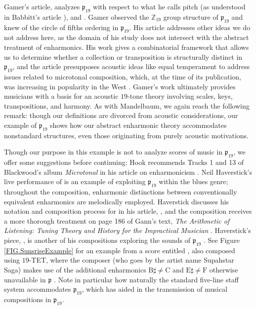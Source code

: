 \documentclass{article}
\theoremstyle{plain}
\theoremstyle{definition}
\theoremstyle{remark}
\begin{document}
Gamer's article,  analyzes $\mathfrak{p}_{19}$ with respect to what he calls pitch   (as understood in Babbitt's article  \cite{BabbittArticle}), and  \cite{Gamer}. Gamer observed the $\mathbb{Z}_{19}$ group structure of $\mathfrak{p}_{19}$ and knew of the circle of fifths ordering in $\mathfrak{p}_{19}$. His article addresses other ideas we do not address here, as the domain of his study does not intersect with the abstract treatment of enharmonics. His work gives a combinatorial framework that allows us to determine whether a collection or transposition is structurally distinct in $\mathfrak{p}_{19}$, and the article presupposes acoustic ideas like equal temperament to address issues related to microtonal composition, which, at the time of its publication, was increasing in popularity in the West \cite{Gamer}. Gamer's work ultimately provides musicians with a basis for an acoustic $19$-tone theory involving scales, keys, transpositions, and harmony. As with Mandelbaum, we again reach the following remark: though our definitions are divorced from acoustic considerations, our example of $\mathfrak{p}_{19}$ shows how our abstract enharmonic theory accommodates nonstandard structures, even those originating from purely acoustic motivations.

Though our purpose in this example is not to analyze scores of music in $\mathfrak{p}_{19}$, we offer some suggestions before continuing: Hook recommends Tracks 1 and 13 of Blackwood's album \textit{Microtonal} \cite{Blackwood} in his article on enharmonicism \cite{Hook}. Neil Haverstick's live performance of  is an example of exploiting $\mathfrak{p}_{19}$ within the blues genre; throughout the composition, enharmonic distinctions between conventionally equivalent enharmonics are melodically employed. Haverstick discusses his notation and composition process for  in his article,  \cite{HaverstickBirdwalk}, and the composition receives a more thorough treatment on page 186 of Gann's text, \textit{The Arithmetic of Listening: Tuning Theory and History for the Impractical Musician} \cite{Gann}. Haverstick's piece, , is another of his compositions exploring the sounds of $\mathfrak{p}_{19}$ \cite{HaverstickMysteries}. See Figure \ref{FIG.SunsriseExample} for an example from a score entitled , also composed using $19$-TET, where the composer (who goes by the artist name Supahstar Saga) makes use of the additional enharmonics $\textrm{B}\sharp\ne\textrm{C}$ and $\textrm{E}\sharp\ne\textrm{F}$ otherwise unavailable in $\mathfrak{p}$ \cite{Saga}. Note in particular how naturally the standard five-line staff system accommodates $\mathfrak{p}_{19}$, which has aided in the transmission of musical compositions in $\mathfrak{p}_{19}$.
\end{document}
